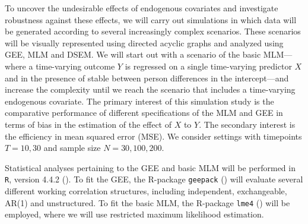 \documentclass[
  12pt,
  a4paper,
]{article}
\begin{document}
To uncover the undesirable effects of endogenous covariates and
investigate robustness against these effects, we will carry out
simulations in which data will be generated according to several
increasingly complex scenarios. These scenarios will be visually
represented using directed acyclic graphs and analyzed using GEE, MLM
and DSEM. We will start out with a scenario of the basic MLM---where a
time-varying outcome \(Y\) is regressed on a single time-varying
predictor \(X\) and in the presence of stable between person differences
in the intercept---and increase the complexity until we reach the
scenario that includes a time-varying endogenous covariate. The primary
interest of this simulation study is the comparative performance of
different specifications of the MLM and GEE in terms of bias in the
estimation of the effect of \(X\) to \(Y\). The secondary interest is
the efficiency in mean squared error (MSE). We consider settings with
timepoints \(T = 10,30\) and sample size \(N = 30, 100, 200\).

Statistical analyses pertaining to the GEE and basic MLM will be
performed in \texttt{R}, version 4.4.2
(). To fit the GEE, the
R-package \texttt{geepack} () will evaluate several different working correlation structures,
including independent, exchangeable, AR(1) and unstructured. To fit the
basic MLM, the R-package \texttt{lme4} () will be employed, where we will use restricted maximum
likelihood estimation.
\end{document}
